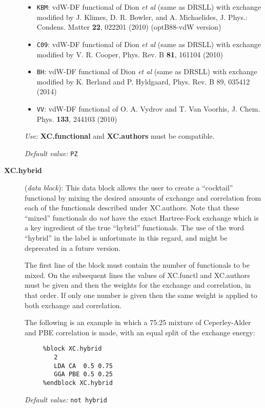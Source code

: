 \begin{description}
\begin{itemize}
\item \texttt{KBM}:
vdW-DF functional of Dion \textit{et al} (same as DRSLL)
with exchange modified by J. Klimes, D. R. Bowler, and A. Michaelides, 
J. Phys.: Condens. Matter \textbf{22}, 022201 (2010) (optB88-vdW version)
\item \texttt{C09}:
vdW-DF functional of Dion \textit{et al} (same as DRSLL)
with exchange modified by V. R. Cooper, Phys. Rev. B \textbf{81}, 161104 (2010)
\item \texttt{BH}:
vdW-DF functional of Dion \textit{et al} (same as DRSLL) 
with exchange modified by 
K. Berland and P. Hyldgaard, Phys. Rev. B 89, 035412 (2014)
\item \texttt{VV}: 
vdW-DF functional of O. A. Vydrov and T. Van Voorhis, 
J. Chem. Phys. \textbf{133}, 244103 (2010)

\end{itemize}

\textit{Use:} \textbf{XC.functional} and \textbf{XC.authors} must be compatible.

\textit{Default value:} \texttt{PZ}

\item[\textbf{XC.hybrid}] (\textit{data block}):
This data block allows the user to create a ``cocktail'' functional by
mixing the desired amounts of exchange and correlation from each of
the functionals described under XC.authors. Note that these ``mixed''
functionals do \emph{not} have the exact Hartree-Fock exchange which
is a key ingredient of the true ``hybrid'' functionals. The use of
the word ``hybrid'' in the label is unfortunate in this regard, and
might be deprecated in a future version.

The first line of the block must contain the number of functionals to
be mixed. On the subsequent lines the values of XC.functl and
XC.authors must be given and then the weights for the exchange and
correlation, in that order. If only one number is given then the same
weight is applied to both exchange and correlation.

The following is an example in which a 75:25 mixture of Ceperley-Alder
and PBE correlation is made, with an equal split of the exchange
energy:

\begin{verbatim}
     %block XC.hybrid
        2
        LDA CA  0.5 0.75
        GGA PBE 0.5 0.25
     %endblock XC.hybrid
\end{verbatim}

\textit{Default value:} \texttt{not hybrid}


\end{description}

